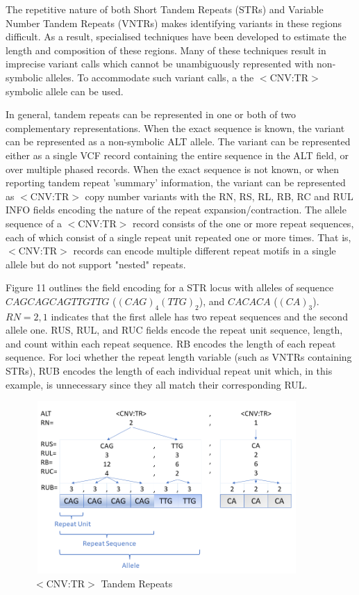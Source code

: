 \documentclass[8pt]{article}
\begin{document}
The repetitive nature of both Short Tandem Repeats (STRs) and Variable Number Tandem Repeats (VNTRs) makes identifying variants in these regions difficult.
As a result, specialised techniques have been developed to estimate the length and composition of these regions.
Many of these techniques result in imprecise variant calls which cannot be unambiguously represented with non-symbolic alleles.
To accommodate such variant calls, a the $<$CNV:TR$>$ symbolic allele can be used.

In general, tandem repeats can be represented in one or both of two complementary representations.
When the exact sequence is known, the variant can be represented as a non-symbolic ALT allele.
The variant can be represented either as a single VCF record containing the entire sequence in the ALT field, or over multiple phased records.
When the exact sequence is not known, or when reporting tandem repeat 'summary' information, the variant can be represented as $<$CNV:TR$>$ copy number variants with the RN, RS, RL, RB, RC and RUL INFO fields encoding the nature of the repeat expansion/contraction.
The allele sequence of a $<$CNV:TR$>$ record consists of the one or more repeat sequences, each of which consist of a single repeat unit repeated one or more times.
That is, $<$CNV:TR$>$ records can encode multiple different repeat motifs in a single allele but do not support "nested" repeats.

Figure 11 outlines the field encoding for a STR locus with alleles of sequence $CAGCAGCAGTTGTTG$ ($(CAG)_{4}(TTG)_{2}$), and $CACACA$ ($(CA)_{3}$).
$RN=2,1$ indicates that the first allele has two repeat sequences and the second allele one.
RUS, RUL, and RUC fields encode the repeat unit sequence, length, and count within each repeat sequence.
RB encodes the length of each repeat sequence.
For loci whether the repeat length variable (such as VNTRs containing STRs), RUB encodes the length of each individual repeat unit which, in this example, is unnecessary since they all match their corresponding RUL.

\begin{figure}[ht]
	\centering
	\includegraphics[width=4in,height=2.58in]{img/tandem_repeat_notation.png}
	\caption{$<$CNV:TR$>$ Tandem Repeats}
\end{figure}
\end{document}
